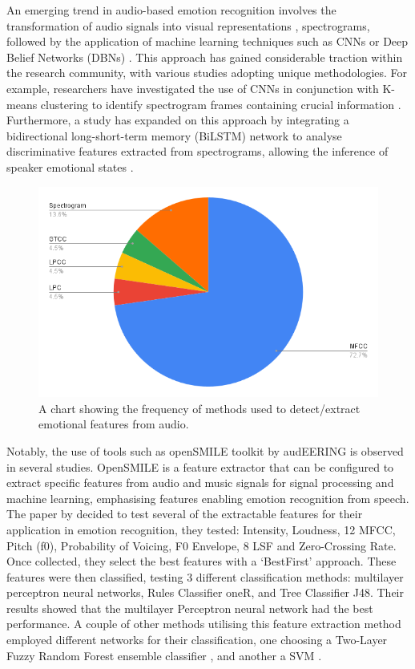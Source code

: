 An emerging trend in audio-based emotion recognition involves the transformation of audio signals into visual representations \cite{Augello2022-hm}, spectrograms, followed by the application of machine learning techniques such as CNNs \cite{Jaiswal2020-vi} or Deep Belief Networks (DBNs) \cite{Mohammed2020-ig}. This approach has gained considerable traction within the research community, with various studies adopting unique methodologies. For example, researchers have investigated the use of CNNs in conjunction with K-means clustering to identify spectrogram frames containing crucial information \cite{Hajarolasvadi2019-nz}. Furthermore, a study has expanded on this approach by integrating a bidirectional long-short-term memory (BiLSTM) network to analyse discriminative features extracted from spectrograms, allowing the inference of speaker emotional states \cite{Mustaqeem2020-ax}.

\begin{figure}[!htb]
    \centering{}
    \includegraphics[scale=0.50]{lit_review_images/chartFeatureExtraction.png}
    \caption{A chart showing the frequency of methods used to detect/extract emotional features from audio.}
    \label{figure:featureExtractionUsage}
\end{figure}

Notably, the use of tools such as openSMILE toolkit by audEERING is observed in several studies. OpenSMILE is a feature extractor that can be configured to extract specific features from audio and music signals for signal processing and machine learning, emphasising features enabling emotion recognition from speech. The paper by \cite{Anjum2019-ks} decided to test several of the extractable features for their application in emotion recognition, they tested: Intensity, Loudness, 12 MFCC, Pitch (f0), Probability of Voicing, F0 Envelope, 8 LSF and Zero-Crossing Rate. Once collected, they select the best features with a `BestFirst' approach.  These features were then classified, testing 3 different classification methods: multilayer perceptron neural networks, Rules Classifier oneR, and Tree Classifier J48. Their results showed that the multilayer Perceptron neural network had the best performance. A couple of other methods utilising this feature extraction method employed different networks for their classification, one choosing a Two-Layer Fuzzy Random Forest ensemble classifier \cite{Chen2020-bt}, and another a SVM \cite{Ashok2022-xp}.

